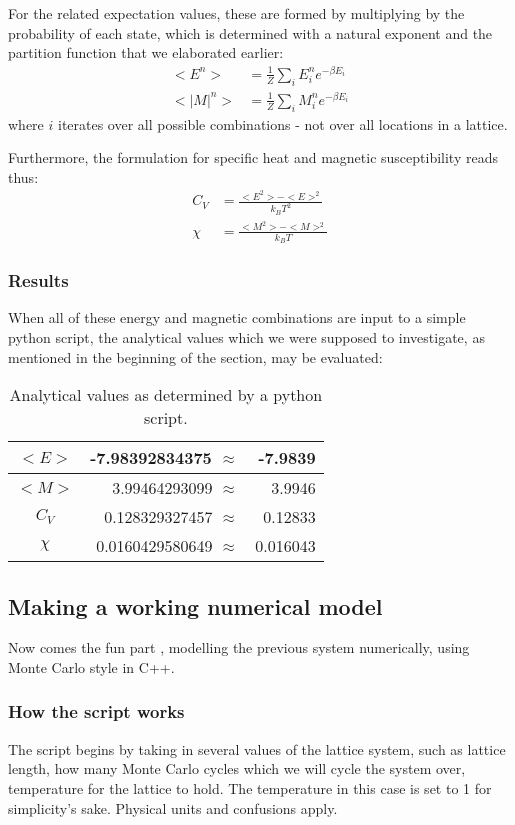 \documentclass[11pt,a4paper,notitlepage,twocolumn]{article}
\begin{document}
For the related expectation values, these are formed by multiplying by the probability of each state, which is determined with a natural exponent and the partition function that we elaborated earlier:
\begin{align}\label{eq:exvals}
<E^n> &= \frac{1}{Z}\sum_i E_i^n e^{-\beta E_i}  \\
<|M|^n> &= \frac{1}{Z}\sum_i M_i^n e^{-\beta E_i} \nonumber
\end{align}
where $i$ iterates over all possible combinations - not over all locations in a lattice.

Furthermore, the formulation for specific heat and magnetic susceptibility reads thus:
\begin{align}\label{eq:specheat_magsus}
C_V &= \frac{<E^2> - <E>^2}{k_B T^2} \\
\chi &= \frac{<M^2> - <M>^2}{k_B T} \nonumber
\end{align}

\subsubsection{Results}
When all of these energy and magnetic combinations are input to a simple python script, the analytical values which we were supposed to investigate, as mentioned in the beginning of the section, may be evaluated:

\begin{table}[H]
\center
\begin{tabular}{|c|r r|}\hline
	$<E>$ &-7.98392834375   $\approx$ & -7.9839\\ \hline
	$<M>$ & 3.99464293099   $\approx$ & 3.9946\\ \hline
	$C_V$ & 0.128329327457  $\approx$ & 0.12833\\ \hline
	$\chi$& 0.0160429580649 $\approx$ & 0.016043\\ \hline
\end{tabular}
\caption{Analytical values as determined by a python script.}\label{table:analyticalresults}
\end{table}

\subsection{Making a working numerical model}
Now comes the fun part%
, modelling the previous system numerically, using Monte Carlo style in C++.

\subsubsection{How the script works}
The script begins by taking in several values of the lattice system, such as lattice length, how many Monte Carlo cycles which we will cycle the system over, temperature for the lattice to hold. The temperature in this case is set to 1 for simplicity's sake. Physical units and confusions apply.
\end{document}
